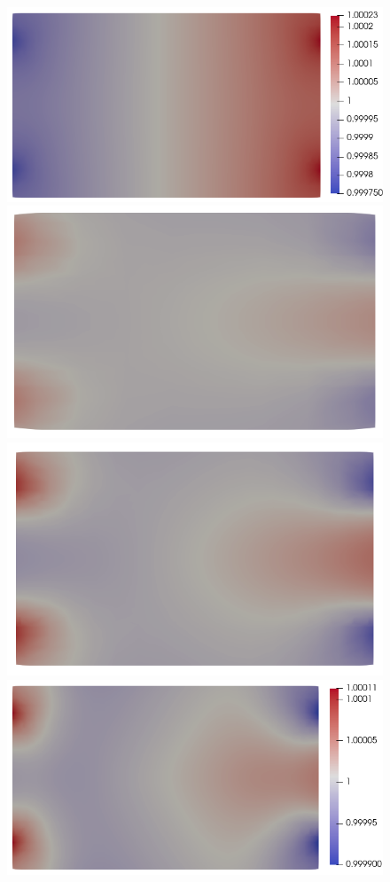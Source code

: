 \documentclass{article}
\begin{document}
\begin{figure}
\begin{minipage}{0.9\textwidth}
    \includegraphics[scale=0.27]{clip_ne_T-1_lambda-1e-1_32-3-4.png}
    \includegraphics[scale=0.27]{clip_ni_T-1_lambda-1e-1_8-2-2.png}
    \includegraphics[scale=0.27]{clip_ni_T-1_lambda-1e-1_16-3-3.png}
    \includegraphics[scale=0.27]{clip_ni_T-1_lambda-1e-1_32-3-4.png}

\end{minipage}
\end{figure}
\end{document}
